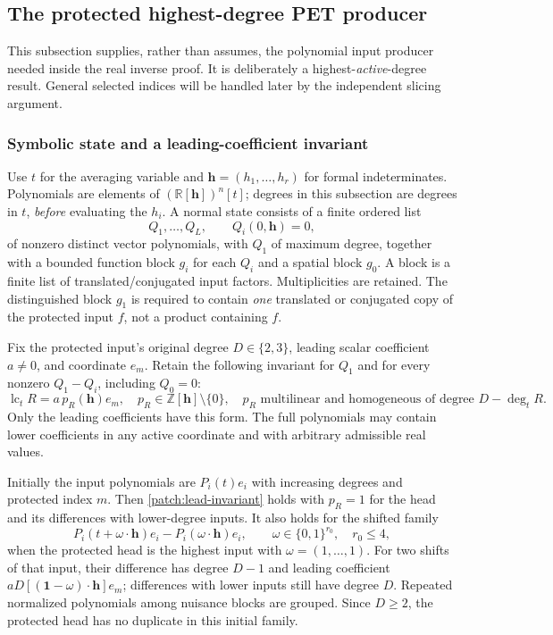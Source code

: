 \documentclass[11pt]{article}
\theoremstyle{definition}
\begin{document}
\subsection{The protected highest-degree PET producer}\label{patch:pet-producer}
This subsection supplies, rather than assumes, the polynomial input producer needed inside the
real inverse proof.  It is deliberately a highest-\emph{active}-degree result.  General selected
indices will be handled later by the independent slicing argument.

\subsubsection{Symbolic state and a leading-coefficient invariant}
Use $t$ for the averaging variable and $\mathbf h=(h_1,\ldots,h_r)$ for formal indeterminates.
Polynomials are elements of $(\mathbb R[\mathbf h])^n[t]$; degrees in this subsection are degrees
in $t$, \emph{before} evaluating the $h_i$.  A normal state consists of a finite ordered list
\[
 Q_1,\ldots,Q_L,\qquad Q_i(0,\mathbf h)=0,
\]
of nonzero distinct vector polynomials, with $Q_1$ of maximum degree, together with a bounded
function block $g_i$ for each $Q_i$ and a spatial block $g_0$.
A block is a finite list of translated/conjugated input factors.  Multiplicities are retained.
The distinguished block $g_1$ is required to contain \emph{one} translated or conjugated copy
of the protected input $f$, not a product containing $f$.

Fix the protected input's original degree $D\in\{2,3\}$, leading scalar coefficient $a\ne0$,
and coordinate $e_m$.  Retain the following invariant for $Q_1$ and for every nonzero
$Q_1-Q_i$, including $Q_0=0$:
\begin{equation}\label{patch:lead-invariant}
 \operatorname{lc}_t R=a\,p_R(\mathbf h)e_m,
 \quad p_R\in\mathbb Z[\mathbf h]\setminus\{0\},
 \quad p_R\text{ multilinear and homogeneous of degree }D-\deg_t R.
\end{equation}
Only the leading coefficients have this form.  The full polynomials may contain lower
coefficients in any active coordinate and with arbitrary admissible real values.

Initially the input polynomials are $P_i(t)e_i$ with increasing degrees and protected index $m$.
Then \eqref{patch:lead-invariant} holds with $p_R=1$ for the head and its differences with
lower-degree inputs.  It also holds for the shifted family
\begin{equation}\label{patch:initial-shift-family}
 P_i(t+\omega\cdot\mathbf h)e_i-P_i(\omega\cdot\mathbf h)e_i,
       \qquad \omega\in\{0,1\}^{r_0},\quad r_0\leq4,
\end{equation}
when the protected head is the highest input with $\omega=(1,\ldots,1)$.
For two shifts of that input, their difference has degree $D-1$ and leading coefficient
$aD[(\mathbf1-\omega)\cdot\mathbf h]e_m$; differences with lower inputs still have degree $D$.
Repeated normalized polynomials among nuisance blocks are grouped.  Since $D\geq2$, the
protected head has no duplicate in this initial family.
\end{document}
